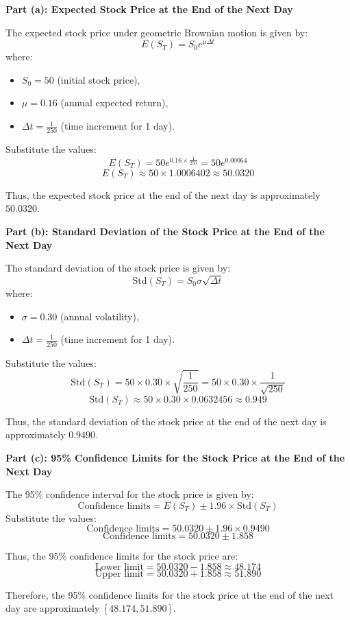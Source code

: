 \documentclass[12pt,letterpaper,onecolumn]{exam}
\begin{document}
\begin{solution}

\textbf{Part (a): Expected Stock Price at the End of the Next Day}

The expected stock price under geometric Brownian motion is given by:
\[
E(S_T) = S_0 e^{\mu \Delta t}
\]
where:
\begin{itemize}
    \item \( S_0 = 50 \) (initial stock price),
    \item \( \mu = 0.16 \) (annual expected return),
    \item \( \Delta t = \frac{1}{250} \) (time increment for 1 day).
\end{itemize}

Substitute the values:
\[
E(S_T) = 50 e^{0.16 \times \frac{1}{250}} = 50 e^{0.00064}
\]
\[
E(S_T) \approx 50 \times 1.0006402 \approx 50.0320
\]

Thus, the expected stock price at the end of the next day is approximately \( \boxed{50.0320} \).

\textbf{Part (b): Standard Deviation of the Stock Price at the End of the Next Day}

The standard deviation of the stock price is given by:
\[
\text{Std}(S_T) = S_0 \sigma \sqrt{\Delta t}
\]
where:
\begin{itemize}
    \item \( \sigma = 0.30 \) (annual volatility),
    \item \( \Delta t = \frac{1}{250} \) (time increment for 1 day).
\end{itemize}

Substitute the values:
\[
\text{Std}(S_T) = 50 \times 0.30 \times \sqrt{\frac{1}{250}} = 50 \times 0.30 \times \frac{1}{\sqrt{250}}
\]
\[
\text{Std}(S_T) \approx 50 \times 0.30 \times 0.0632456 \approx 0.949
\]

Thus, the standard deviation of the stock price at the end of the next day is approximately \( \boxed{0.9490} \).

\textbf{Part (c): 95\% Confidence Limits for the Stock Price at the End of the Next Day}

The 95\% confidence interval for the stock price is given by:
\[
\text{Confidence limits} = E(S_T) \pm 1.96 \times \text{Std}(S_T)
\]
Substitute the values:
\[
\text{Confidence limits} = 50.0320 \pm 1.96 \times 0.9490
\]
\[
\text{Confidence limits} = 50.0320 \pm 1.858
\]

Thus, the 95\% confidence limits for the stock price are:
\[
\text{Lower limit} = 50.0320 - 1.858 \approx 48.174
\]
\[
\text{Upper limit} = 50.0320 + 1.858 \approx 51.890
\]

Therefore, the 95\% confidence limits for the stock price at the end of the next day are approximately \( \boxed{[48.174, 51.890]} \).

\end{solution}
\end{document}
